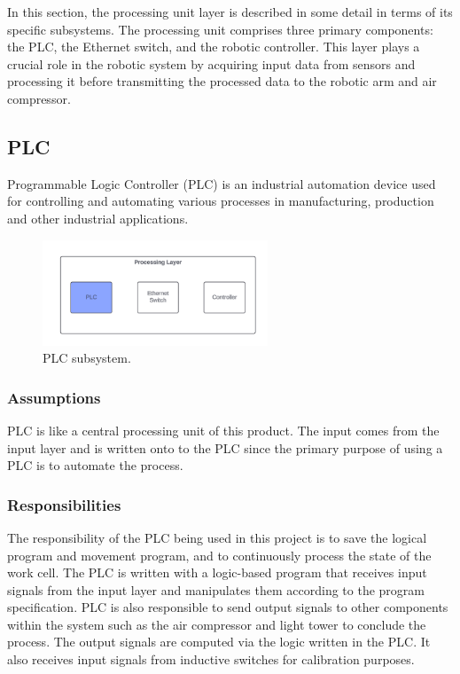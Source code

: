 In this section, the processing unit layer is described in some detail in terms of its specific subsystems. The processing unit comprises three primary components: the PLC, the Ethernet switch, and the robotic controller. This layer plays a crucial role in the robotic system by acquiring input data from sensors and processing it before transmitting the processed data to the robotic arm and air compressor.

\subsection{PLC}
Programmable Logic Controller (PLC) is an industrial automation device used for controlling and automating various processes in manufacturing, production and other industrial applications.

\begin{figure}[h!]
	\centering
 	\includegraphics[width=0.60\textwidth]{images/Processing_PLC.png}
 \caption{PLC subsystem.}
\end{figure}

\subsubsection{Assumptions}
PLC is like a central processing unit of this product. The input comes from the input layer and is written onto to the PLC since the primary purpose of using a PLC is to automate the process. 

\subsubsection{Responsibilities}
The responsibility of the PLC being used in this project is to save the logical program and movement program, and to continuously process the state of the work cell. The PLC is written with a logic-based program that receives input signals from the input layer and manipulates them according to the program specification. PLC is also responsible to send output signals to other components within the system such as the air compressor and light tower to conclude the process. The output signals are computed via the logic written in the PLC. It also receives input signals from inductive switches for calibration purposes. 


